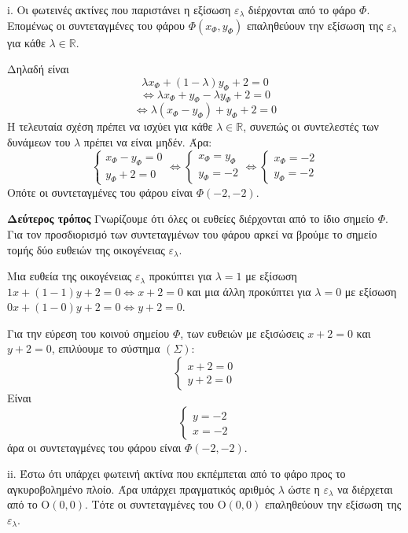 \textnormal{i.} Οι φωτεινές ακτίνες που παριστάνει η εξίσωση $\varepsilon_{\lambda}$ διέρχονται από το φάρο $\Phi$. Επομένως οι συντεταγμένες του φάρου $\Phi(x_\Phi, y_\Phi)$ επαληθεύουν την εξίσωση της $\varepsilon_{\lambda}$ για κάθε $\lambda \in \mathbb{R}$.

Δηλαδή είναι
\[
\lambda x_\Phi + (1-\lambda) y_\Phi + 2 = 0
\]
\[
\Leftrightarrow \lambda x_\Phi + y_\Phi - \lambda y_\Phi + 2 = 0
\]
\[
\Leftrightarrow \lambda(x_\Phi - y_\Phi) + y_\Phi + 2 = 0
\]
Η τελευταία σχέση πρέπει να ισχύει για κάθε $\lambda \in \mathbb{R}$, συνεπώς οι συντελεστές των δυνάμεων του $\lambda$ πρέπει να είναι μηδέν. Άρα:
\[
\left\{
\begin{array}{l}
x_\Phi - y_\Phi = 0 \\
y_\Phi + 2 = 0
\end{array}
\right.
\Leftrightarrow
\left\{
\begin{array}{l}
x_\Phi = y_\Phi \\
y_\Phi = -2
\end{array}
\right.
\Leftrightarrow
\left\{
\begin{array}{l}
x_\Phi = -2 \\
y_\Phi = -2
\end{array}
\right.
\]
Οπότε οι συντεταγμένες του φάρου είναι $\Phi(-2, -2)$.

\textbf{Δεύτερος τρόπος}
Γνωρίζουμε ότι όλες οι ευθείες διέρχονται από το ίδιο σημείο $\Phi$. Για τον προσδιορισμό των συντεταγμένων του φάρου αρκεί να βρούμε το σημείο τομής δύο ευθειών της οικογένειας $\varepsilon_{\lambda}$.

Μια ευθεία της οικογένειας $\varepsilon_{\lambda}$ προκύπτει για $\lambda=1$ με εξίσωση $1x+(1-1)y+2=0 \Leftrightarrow x+2=0$ και μια άλλη προκύπτει για $\lambda=0$ με εξίσωση $0x+(1-0)y+2=0 \Leftrightarrow y+2=0$.

Για την εύρεση του κοινού σημείου $\Phi$, των ευθειών με εξισώσεις $x+2=0$ και $y+2=0$, επιλύουμε το σύστημα $(\Sigma)$:
\[
\left\{
\begin{array}{l}
x+2=0 \\
y+2=0
\end{array}
\right.
\]
Είναι
\[
\left\{
\begin{array}{l}
y=-2 \\
x=-2
\end{array}
\right.
\]
άρα οι συντεταγμένες του φάρου είναι $\Phi(-2, -2)$.

\textnormal{ii.} Έστω ότι υπάρχει φωτεινή ακτίνα που εκπέμπεται από το φάρο προς το αγκυροβολημένο πλοίο. Άρα υπάρχει πραγματικός αριθμός $\lambda$ ώστε η $\varepsilon_{\lambda}$ να διέρχεται από το $\mathrm{O}(0,0)$. Τότε οι συντεταγμένες του $\mathrm{O}(0,0)$ επαληθεύουν την εξίσωση της $\varepsilon_{\lambda}$.

